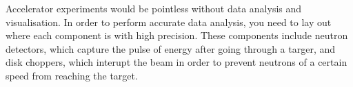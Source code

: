 Accelerator experiments would be pointless without data analysis and visualisation. In order to perform accurate data analysis, you need to lay out where each component is with high precision. These components include neutron detectors, which capture the pulse of energy after going through a targer, and disk choppers, which interupt the beam in order to prevent neutrons of a certain speed from reaching the target.


